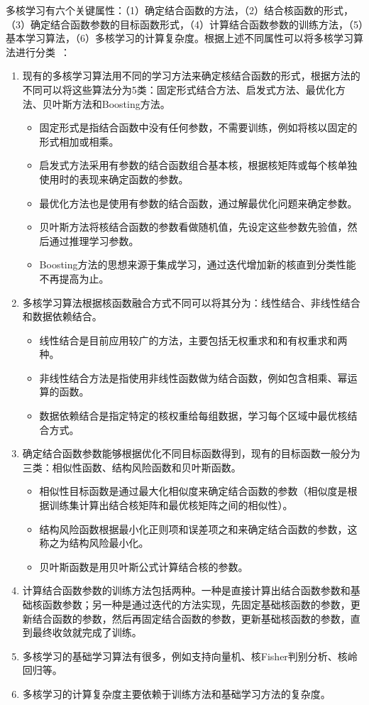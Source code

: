 多核学习有六个关键属性：（1）确定结合函数的方法，（2）结合核函数的形式，（3）确定结合函数参数的目标函数形式，（4）计算结合函数参数的训练方法，（5）基本学习算法，（6）多核学习的计算复杂度。根据上述不同属性可以将多核学习算法进行分类~\cite{gonen2011multiple}：
\begin{enumerate}
\item 现有的多核学习算法用不同的学习方法来确定核结合函数的形式，根据方法的不同可以将这些算法分为5类：固定形式结合方法、启发式方法、最优化方法、贝叶斯方法和Boosting方法。
  \begin{itemize}
  \item 固定形式是指结合函数中没有任何参数，不需要训练，例如将核以固定的形式相加或相乘。
  \item 启发式方法采用有参数的结合函数组合基本核，根据核矩阵或每个核单独使用时的表现来确定函数的参数。
  \item 最优化方法也是使用有参数的结合函数，通过解最优化问题来确定参数。
  \item 贝叶斯方法将核结合函数的参数看做随机值，先设定这些参数先验值，然后通过推理学习参数。
  \item Boosting方法的思想来源于集成学习，通过迭代增加新的核直到分类性能不再提高为止。
  \end{itemize}
\item 多核学习算法根据核函数融合方式不同可以将其分为：线性结合、非线性结合和数据依赖结合。
  \begin{itemize}
  \item 线性结合是目前应用较广的方法，主要包括无权重求和和有权重求和两种。
  \item 非线性结合方法是指使用非线性函数做为结合函数，例如包含相乘、幂运算的函数。
  \item 数据依赖结合是指定特定的核权重给每组数据，学习每个区域中最优核结合方式。
  \end{itemize}
\item 确定结合函数参数能够根据优化不同目标函数得到，现有的目标函数一般分为三类：相似性函数、结构风险函数和贝叶斯函数。
  \begin{itemize}
  \item 相似性目标函数是通过最大化相似度来确定结合函数的参数（相似度是根据训练集计算出结合核矩阵和最优核矩阵之间的相似性）。
  \item 结构风险函数根据最小化正则项和误差项之和来确定结合函数的参数，这称之为结构风险最小化。
  \item 贝叶斯函数是用贝叶斯公式计算结合核的参数。
  \end{itemize}
\item 计算结合函数参数的训练方法包括两种。一种是直接计算出结合函数参数和基础核函数参数；另一种是通过迭代的方法实现，先固定基础核函数的参数，更新结合函数的参数，然后再固定结合函数的参数，更新基础核函数的参数，直到最终收敛就完成了训练。
\item 多核学习的基础学习算法有很多，例如支持向量机、核Fisher判别分析、核岭回归等。
\item 多核学习的计算复杂度主要依赖于训练方法和基础学习方法的复杂度。
\end{enumerate}

